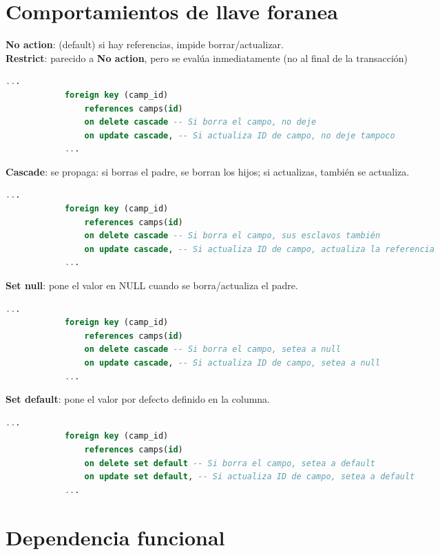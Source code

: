 \documentclass{article}
\begin{document}
\begin{multicols}{2}
		\section{Comportamientos de llave foranea}
		
		\textbf{No action}: (default) si hay referencias, impide borrar/actualizar.\\
		\textbf{Restrict}: parecido a \textbf{No action}, pero se evalúa inmediatamente (no al final de la transacción)
		
		\begin{lstlisting}[language=sql]
			...
			foreign key (camp_id) 
				references camps(id)
				on delete cascade -- Si borra el campo, no deje
				on update cascade, -- Si actualiza ID de campo, no deje tampoco
			...
		\end{lstlisting}
		
		\textbf{Cascade}: se propaga: si borras el padre, se borran los hijos; si actualizas, también se actualiza.
		
		\begin{lstlisting}[language=sql]
			...
			foreign key (camp_id) 
				references camps(id)
				on delete cascade -- Si borra el campo, sus esclavos también
				on update cascade, -- Si actualiza ID de campo, actualiza la referencia
			...
		\end{lstlisting}
		
		\textbf{Set null}: pone el valor en NULL cuando se borra/actualiza el padre.
		
		\begin{lstlisting}[language=sql]
			...
			foreign key (camp_id) 
				references camps(id)
				on delete cascade -- Si borra el campo, setea a null
				on update cascade, -- Si actualiza ID de campo, setea a null
			...
		\end{lstlisting}
		
		\textbf{Set default}: pone el valor por defecto definido en la columna.
		
		\begin{lstlisting}[language=sql]
			...
			foreign key (camp_id) 
				references camps(id)
				on delete set default -- Si borra el campo, setea a default
				on update set default, -- Si actualiza ID de campo, setea a default
			...
		\end{lstlisting}
		
		\section{Dependencia funcional}
		

\end{multicols}
\end{document}
